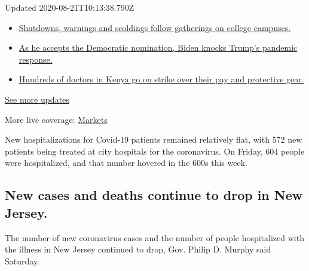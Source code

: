 Updated 2020-08-21T10:13:38.790Z

\begin{itemize}
\tightlist
\item
  \href{https://www.nytimes3xbfgragh.onion/2020/08/21/world/covid-19-coronavirus.html?action=click\&pgtype=Article\&state=default\&region=MAIN_CONTENT_1\&context=storylines_live_updates\#link-4690b6aa}{Shutdowns,
  warnings and scoldings follow gatherings on college campuses.}
\item
  \href{https://www.nytimes3xbfgragh.onion/2020/08/21/world/covid-19-coronavirus.html?action=click\&pgtype=Article\&state=default\&region=MAIN_CONTENT_1\&context=storylines_live_updates\#link-324af071}{As
  he accepts the Democratic nomination, Biden knocks Trump's pandemic
  response.}
\item
  \href{https://www.nytimes3xbfgragh.onion/2020/08/21/world/covid-19-coronavirus.html?action=click\&pgtype=Article\&state=default\&region=MAIN_CONTENT_1\&context=storylines_live_updates\#link-35890b73}{Hundreds
  of doctors in Kenya go on strike over their pay and protective gear.}
\end{itemize}

\href{https://www.nytimes3xbfgragh.onion/2020/08/21/world/covid-19-coronavirus.html?action=click\&pgtype=Article\&state=default\&region=MAIN_CONTENT_1\&context=storylines_live_updates}{See
more updates}

More live coverage:
\href{https://www.nytimes3xbfgragh.onion/live/2020/08/20/business/stock-market-today-coronavirus?action=click\&pgtype=Article\&state=default\&region=MAIN_CONTENT_1\&context=storylines_live_updates}{Markets}

New hospitalizations for Covid-19 patients remained relatively flat,
with 572 new patients being treated at city hospitals for the
coronavirus. On Friday, 604 people were hospitalized, and that number
hovered in the 600s this week.

\hypertarget{new-cases-and-deaths-continue-to-drop-in-new-jersey}{%
\subsection{New cases and deaths continue to drop in New
Jersey.}\label{new-cases-and-deaths-continue-to-drop-in-new-jersey}}

The number of new coronavirus cases and the number of people
hospitalized with the illness in New Jersey continued to drop, Gov.
Philip D. Murphy said Saturday.


